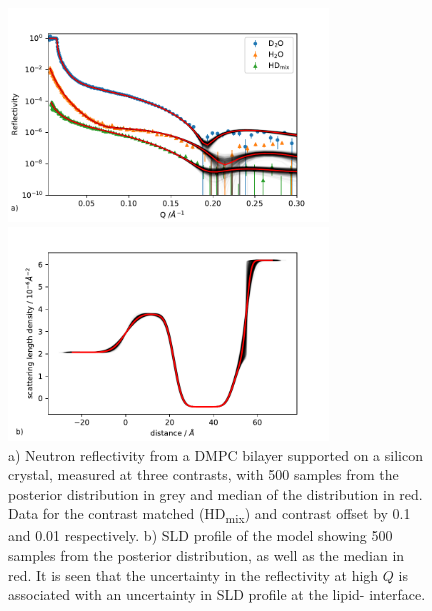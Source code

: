 \documentclass[pdf,preprint]{iucr}
\begin{document}
\begin{figure}
\centering
\label{fig:global_fit}%
\includegraphics[width=85mm]{./supporting_information/global_fit.pdf}%


\includegraphics[width=85mm]{./supporting_information/d2o_sld_spread.pdf}

\caption{a) Neutron reflectivity from a DMPC bilayer supported on a silicon crystal, measured at three contrasts, with 500 samples from the posterior distribution in grey and median of the distribution in red. Data for the contrast matched (HD\textsubscript{mix}) and  contrast offset by 0.1 and 0.01 respectively. b) SLD profile of the  model showing 500 samples from the posterior distribution, as well as the median in red. It is seen that the uncertainty in the reflectivity at high $Q$ is associated with an uncertainty in SLD profile at the lipid- interface.}
\end{figure}
\end{document}
